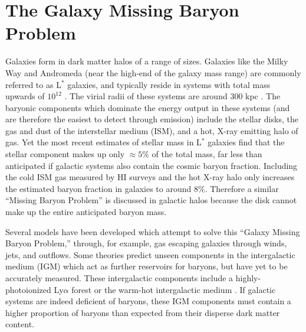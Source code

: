 \section{The Galaxy Missing Baryon Problem}
\label{sec:Missing.Galaxies}

Galaxies form in dark matter halos of a range of sizes. Galaxies like
the Milky Way and Andromeda (near the high-end of the galaxy mass
range) are commonly referred to as L$^*$ galaxies, and typically
reside in systems with total mass upwards of $10^{12}$ \Msun{}
\citep{Moster2010}. The virial radii of these systems are around 300
kpc \citep[][and refs.~therein]{Werk2014}. The baryonic components
which dominate the energy output in these systems (and are therefore
the easiest to detect through emission) include the stellar disks, the
gas and dust of the interstellar medium (ISM), and a hot, X-ray
emitting halo of gas. Yet the most recent estimates of stellar mass in
L$^*$ galaxies \citep{Behroozi2010} find that the stellar component
makes up only $\approx5\%$ of the total mass, far less than
anticipated if galactic systems also contain the cosmic baryon
fraction. Including the cold ISM gas measured by HI surveys and the
hot X-ray halo \citep[][respectively]{Martin2010, Gupta2012} only
increases the estimated baryon fraction in galaxies to around
$8\%$. Therefore a similar ``Missing Baryon Problem'' is discussed in
galactic halos because the disk cannot make up the entire anticipated
baryon mass.

Several models have been developed which attempt to solve this
``Galaxy Missing Baryon Problem,'' through, for example, gas
escaping galaxies through winds, jets, and outflows. Some theories
predict unseen components in the intergalactic medium (IGM) which act
as further reservoirs for baryons, but have yet to be accurately
measured. These intergalactic components include a highly-photoionized
Ly$\alpha$ forest \citep{Sargent1980, Cen1994} or the warm-hot
intergalactic medium \citep[WHIM][]{Cen1999, Dave1999}. If galactic
systems are indeed deficient of baryons, these IGM components must
contain a higher proportion of baryons than expected from their
disperse dark matter content.

